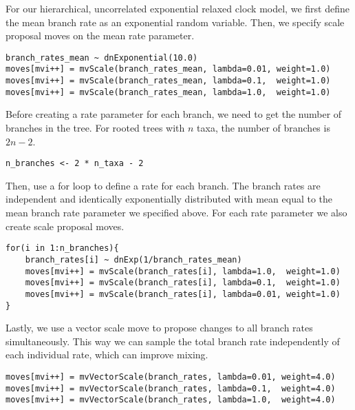 For our hierarchical, uncorrelated exponential relaxed clock model, we first define the mean branch rate as an exponential random variable.
Then, we specify scale proposal moves on the mean rate parameter.
{\tt \begin{snugshade*}
\begin{lstlisting}
branch_rates_mean ~ dnExponential(10.0)
moves[mvi++] = mvScale(branch_rates_mean, lambda=0.01, weight=1.0)
moves[mvi++] = mvScale(branch_rates_mean, lambda=0.1,  weight=1.0)
moves[mvi++] = mvScale(branch_rates_mean, lambda=1.0,  weight=1.0)
\end{lstlisting}
\end{snugshade*}}

Before creating a rate parameter for each branch, we need to get the number of branches in the tree. For rooted trees with $n$ taxa, the number of branches is $2n-2$.

{\tt \begin{snugshade*}
\begin{lstlisting}
n_branches <- 2 * n_taxa - 2
\end{lstlisting}
\end{snugshade*}}

Then, use a for loop to define a rate for each branch.
The branch rates are independent and identically exponentially distributed with mean equal to the mean branch rate parameter we specified above.
For each rate parameter we also create scale proposal moves.
{\tt \begin{snugshade*}
\begin{lstlisting}
for(i in 1:n_branches){
    branch_rates[i] ~ dnExp(1/branch_rates_mean)
    moves[mvi++] = mvScale(branch_rates[i], lambda=1.0,  weight=1.0)
    moves[mvi++] = mvScale(branch_rates[i], lambda=0.1,  weight=1.0)
    moves[mvi++] = mvScale(branch_rates[i], lambda=0.01, weight=1.0)
}
\end{lstlisting}
\end{snugshade*}}

Lastly, we use a vector scale move to propose changes to all branch rates simultaneously.
This way we can sample the total branch rate independently of each individual rate, which can improve mixing.
{\tt \begin{snugshade*}
\begin{lstlisting}
moves[mvi++] = mvVectorScale(branch_rates, lambda=0.01, weight=4.0) 
moves[mvi++] = mvVectorScale(branch_rates, lambda=0.1,  weight=4.0) 
moves[mvi++] = mvVectorScale(branch_rates, lambda=1.0,  weight=4.0)
\end{lstlisting}
\end{snugshade*}}

